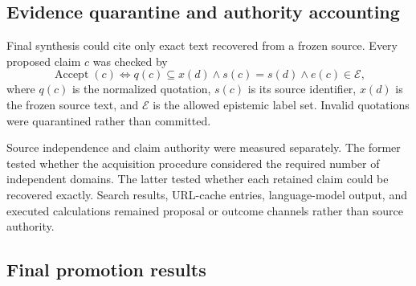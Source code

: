 \subsection{Evidence quarantine and authority accounting}
\label{subsec:arena-v2-authority}

Final synthesis could cite only exact text recovered from a frozen source.
Every proposed claim $c$ was checked by
\begin{equation}
\operatorname{Accept}(c)
\Longleftrightarrow
q(c)\subseteq x(d)
\land s(c)=s(d)
\land e(c)\in\mathcal{E},
\label{eq:arena-v2-claim-gate}
\end{equation}
where $q(c)$ is the normalized quotation, $s(c)$ is its source identifier,
$x(d)$ is the frozen source text, and $\mathcal{E}$ is the allowed epistemic
label set.  Invalid quotations were quarantined rather than committed.

Source independence and claim authority were measured separately.  The former
tested whether the acquisition procedure considered the required number of
independent domains.  The latter tested whether each retained claim could be
recovered exactly.  Search results, URL-cache entries, language-model output,
and executed calculations remained proposal or outcome channels rather than
source authority.


\subsection{Final promotion results}
\label{subsec:arena-v2-results}

